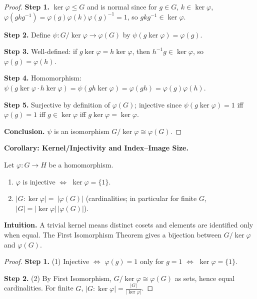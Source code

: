 \documentclass[9pt]{article}
\theoremstyle{definition}
\begin{document}
\begin{proof}
\textbf{Step 1.} $\ker\varphi\le G$ and is normal since for $g\in G$, $k\in\ker\varphi$,
$\varphi(gkg^{-1})=\varphi(g)\varphi(k)\varphi(g)^{-1}=1$, so $gkg^{-1}\in\ker\varphi$.

\textbf{Step 2.} Define $\psi:G/\ker\varphi\to \varphi(G)$ by $\psi(g\ker\varphi)=\varphi(g)$.

\textbf{Step 3.} Well-defined: if $g\ker\varphi=h\ker\varphi$, then $h^{-1}g\in\ker\varphi$, so $\varphi(g)=\varphi(h)$.

\textbf{Step 4.} Homomorphism: $\psi(g\ker\varphi\cdot h\ker\varphi)=\psi(gh\ker\varphi)=\varphi(gh)=\varphi(g)\varphi(h)$.

\textbf{Step 5.} Surjective by definition of $\varphi(G)$; injective since $\psi(g\ker\varphi)=1$ iff $\varphi(g)=1$ iff $g\in\ker\varphi$ iff $g\ker\varphi=\ker\varphi$.

\textbf{Conclusion.} $\psi$ is an isomorphism $G/\ker\varphi\cong\varphi(G)$.
\end{proof}

\newpage


\noindent\textbf{Corollary: Kernel/Injectivity and Index–Image Size.}

\newpage

Let $\varphi:G\to H$ be a homomorphism.
\begin{enumerate}
  \item $\varphi$ is injective $\iff$ $\ker\varphi=\{1\}$.
  \item $|G:\ker\varphi|=\ |\varphi(G)|$ (cardinalities; in particular for finite $G$, $|G|=|\ker\varphi|\,|\varphi(G)|$).
\end{enumerate}

\dotfill

\noindent\textbf{Intuition.}
A trivial kernel means distinct cosets and elements are identified only when equal. The First Isomorphism Theorem gives a bijection between $G/\ker\varphi$ and $\varphi(G)$.

\dotfill

\begin{proof}
\textbf{Step 1.} (1) Injective $\iff$ $\varphi(g)=1$ only for $g=1$ $\iff$ $\ker\varphi=\{1\}$.

\textbf{Step 2.} (2) By First Isomorphism, $G/\ker\varphi\cong \varphi(G)$ as sets, hence equal cardinalities. For finite $G$, $|G:\ker\varphi|=\frac{|G|}{|\ker\varphi|}$.
\end{proof}
\end{document}
